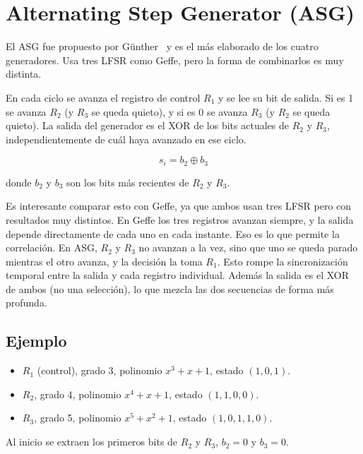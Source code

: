 \section{Alternating Step Generator (ASG)}
\label{sec:asg}

El ASG fue propuesto por Günther~\cite{gunther1987} y es el más elaborado de los cuatro generadores.
Usa tres LFSR como Geffe, pero la forma de combinarlos es muy distinta.

En cada ciclo se avanza el registro de control $R_1$ y se lee su bit de salida.
Si es 1 se avanza $R_2$ (y $R_3$ se queda quieto), y si es 0 se avanza $R_3$ (y $R_2$ se queda quieto).
La salida del generador es el XOR de los bits actuales de $R_2$ y $R_3$, independientemente de cuál haya avanzado en ese ciclo.

\[
  s_i = b_2 \oplus b_3
\]

donde $b_2$ y $b_3$ son los bits más recientes de $R_2$ y $R_3$.

Es interesante comparar esto con Geffe, ya que ambos usan tres LFSR pero con resultados muy distintos.
En Geffe los tres registros avanzan siempre, y la salida depende directamente de cada uno en cada instante.
Eso es lo que permite la correlación. En ASG, $R_2$ y $R_3$ no avanzan a la vez, sino que uno se queda parado mientras el otro avanza,
y la decisión la toma $R_1$. Esto rompe la sincronización temporal entre la salida y cada registro individual.
Además la salida es el XOR de ambos (no una selección), lo que mezcla las dos secuencias de forma más profunda.

\subsection{Ejemplo}

\begin{itemize}
  \item $R_1$ (control), grado 3, polinomio $x^3 + x + 1$, estado $(1, 0, 1)$.
  \item $R_2$, grado 4, polinomio $x^4 + x + 1$, estado $(1, 1, 0, 0)$.
  \item $R_3$, grado 5, polinomio $x^5 + x^2 + 1$, estado $(1, 0, 1, 1, 0)$.
\end{itemize}

Al inicio se extraen los primeros bits de $R_2$ y $R_3$, $b_2 = 0$ y $b_3 = 0$.

